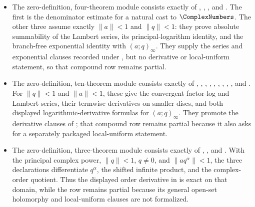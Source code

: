 \documentclass[11pt,a4paper,oneside,openany]{book}
\theoremstyle{definition}
\theoremstyle{remark}
\newcommand{\statuspartial}{\textsf{\color{statusamber}partial}}
\begin{document}
\begin{itemize}
\item The zero-definition, four-theorem module
 consists exactly of
,
,
, and
.  The first is the
denominator estimate for a natural cast to \(\ComplexNumbers\).  The other
three assume exactly \(\lVert a\rVert<1\) and \(\lVert q\rVert<1\): they prove
absolute summability of the Lambert series, its principal-logarithm
 identity, and the branch-free exponential identity with
\((a;q)_\infty\).  They supply the series and exponential clauses recorded
under , but no derivative or local-uniform statement,
so that compound row remains \statuspartial.

\item The zero-definition, ten-theorem module
 consists exactly of
,
,
,
,
,
,
,
,
, and
.  For
\(\lVert q\rVert<1\) and \(\lVert a\rVert<1\), these give the convergent
factor-log and Lambert series, their termwise derivatives on smaller discs,
and both displayed logarithmic-derivative formulas for
\((a;q)_\infty\).  They promote the derivative clauses of
; that compound row remains partial because it also asks
for a separately packaged local-uniform statement.

\item The zero-definition, three-theorem module
 consists exactly of
,
, and
.  With the principal complex power,
\(\lVert q\rVert<1\), \(q\ne0\), and
\(\lVert aq^\alpha\rVert<1\), the three declarations differentiate
\(q^\alpha\), the shifted infinite product, and the complex-order quotient.
Thus the displayed order derivative in  is exact
on that domain, while the row remains partial because its general open-set
holomorphy and local-uniform clauses are not formalized.


\end{itemize}
\end{document}
